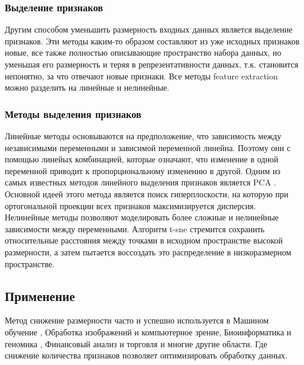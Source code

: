 		\subsubsection{Выделение признаков}	
			Другим способом уменьшить размерность входных данных является выделение признаков. Эти методы каким-то образом составляют из уже исходных признаков новые, все также полностью описывающие пространство набора данных, но уменьшая его размерность и теряя в репрезентативности данных, т.к. становится непонятно, за что отвечают новые признаки. Все методы feature extraction можно разделить на линейные и нелинейные.\\

		\subsubsection{Методы выделения признаков}
			Линейные методы основываются на предположение, что зависимость между независимыми переменными и зависимой переменной линейна. Поэтому они с помощью линейых комбинацией, которые означают, что изменение в одной переменной приводит к пропорциональному изменению в другой. Одним из самых известных методов линейного выделения признаков является PCA . Основной идеей этого метода является поиск  гиперплоскости, на которую при ортогональной проекции всех признаков максимизируется дисперсия.
			Нелинейные методы позволяют моделировать более сложные и нелинейные зависимости между переменными. Алгоритм t-sne стремится сохранить относительные расстояния между точками в исходном пространстве высокой размерности, а затем  пытается воссоздать это распределение в низкоразмерном пространстве.

	\subsection{Применение}
		Метод снижение размерности часто и успешно используется в Машином обучение , Обработка изображений и компьютерное зрение, Биоинформатика и геномика , Финансовый анализ и торговля и многие другие области. Где снижение количества признаков позволяет оптимизировать обработку данных.



